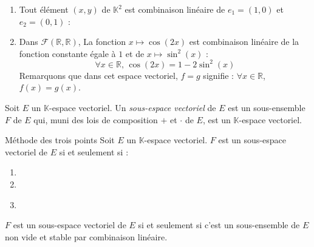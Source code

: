 \documentclass[french,11pt,twoside]{VcCours}
\begin{document}
\newpage

\begin{Exemples}
\begin{enumerate}
\item Tout élément $(x,y)$ de $\mathbb{K}^2$ est combinaison linéaire de $e_1=(1,0)$ et $e_2=(0,1)$ :

\phantom{$(x,y) = x(1,0)+ y(0,1)= xe_1 + y e_2$}
\item Dans $\mathcal{F}(\mathbb{R},\mathbb{R})$, La fonction $x \mapsto \cos(2x)$ est combinaison linéaire de la fonction constante égale à $1$ et de $x \mapsto \sin^2(x)$ :
$$ \forall x \in \mathbb{R}, \, \cos(2x) = 1 - 2 \sin^2(x)$$
Remarquons que dans cet espace vectoriel, $f=g$ signifie : $\forall x \in \mathbb{R}$, $f(x)=g(x)$.
\end{enumerate}
\end{Exemples}



\begin{Definition}{} Soit $E$ un $\mathbb{K}$-espace vectoriel. Un \emph{sous-espace vectoriel} de $E$ est un sous-ensemble $F$ de $E$ qui, muni  des lois de composition $+$ et $\cdot$ de $E$, est un $\mathbb{K}$-espace vectoriel.
\end{Definition}

\begin{Proposition}{Méthode des trois points}
Soit $E$ un $\mathbb{K}$-espace vectoriel. $F$ est un sous-espace vectoriel de $E$ si et seulement si :
\begin{enumerate}
\item \phantom{$F \subset E$.}
\item {}
\item {}

$\phantom{jj}$
\end{enumerate}
\end{Proposition}

\begin{Remarque}{}
$F$ est un sous-espace vectoriel de $E$ si et seulement si c'est un sous-ensemble de $E$ non vide et stable par combinaison linéaire.
\end{Remarque}
\end{document}
